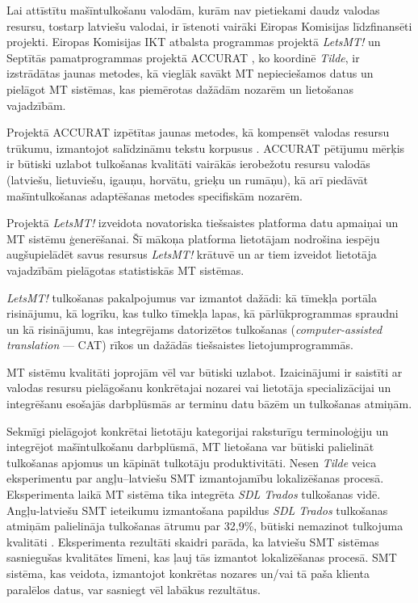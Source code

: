 \begin{multicols}{2}
Lai attīstītu mašīntulkošanu valodām, kurām nav pietiekami daudz valodas resursu, tostarp latviešu valodai, ir īstenoti vairāki Eiropas Komisijas līdzfinansēti projekti. 
Eiropas Komisijas IKT atbalsta programmas projektā \textit{LetsMT!} \cite{Meta30} un Septītās pamatprogrammas projektā ACCURAT \cite{Meta31}, ko koordinē \textit{Tilde}, ir izstrādātas jaunas metodes, kā vieglāk savākt MT nepieciešamos datus un pielāgot MT sistēmas, kas piemērotas dažādām nozarēm un lietošanas vajadzībām.

Projektā ACCURAT izpētītas jaunas metodes, kā kompensēt valodas resursu trūkumu, izmantojot salīdzināmu tekstu korpusus \cite{Meta32, Meta33}. 
ACCURAT pētījumu mērķis ir būtiski uzlabot tulkošanas kvalitāti vairākās ierobežotu resursu valodās (latviešu, lietuviešu, igauņu, horvātu, grieķu un rumāņu), kā arī piedāvāt mašīntulkošanas adaptēšanas metodes specifiskām nozarēm.

Projektā \textit{LetsMT!} \cite{Meta34} izveidota novatoriska tiešsaistes platforma datu apmaiņai un MT sistēmu ģenerēšanai.
Šī mākoņa platforma lietotājam nodrošina iespēju augšupielādēt savus resursus \textit{LetsMT!} krātuvē un ar tiem izveidot lietotāja vajadzībām pielāgotas statistiskās MT sistēmas. 

\textit{LetsMT!} tulkošanas pakalpojumus var izmantot dažādi: kā tīmekļa portāla risinājumu, kā logrīku, kas tulko tīmekļa lapas, kā pārlūkprogrammas spraudni un kā risinājumu, kas integrējams datorizētos tulkošanas (\textit{computer-assisted translation} — CAT) rīkos un dažādās tiešsaistes lietojumprogrammās. 

MT sistēmu kvalitāti joprojām vēl var būtiski uzlabot.
Izaicinājumi ir saistīti ar valodas resursu pielāgošanu konkrētajai nozarei vai lietotāja specializācijai un integrēšanu esošajās darbplūsmās ar terminu datu bāzēm un tulkošanas atmiņām. 

Sekmīgi pielāgojot konkrētai lietotāju kategorijai raksturīgu terminoloģiju un integrējot mašīntulkošanu darbplūsmā, MT lietošana var būtiski palielināt tulkošanas apjomus un kāpināt tulkotāju produktivitāti.
Nesen \textit{Tilde} veica eksperimentu par angļu--latviešu SMT izmantojamību lokalizēšanas procesā.
Eksperimenta laikā MT sistēma tika integrēta \textit{SDL Trados} tulkošanas vidē.
Angļu-latviešu SMT ieteikumu izmantošana papildus \textit{SDL Trados} tulkošanas atmiņām palielināja tulkošanas ātrumu par 32,9\%, būtiski nemazinot tulkojuma kvalitāti \cite{Meta35}.
Eksperimenta rezultāti skaidri parāda, ka latviešu SMT sistēmas sasniegušas kvalitātes līmeni, kas ļauj tās izmantot lokalizēšanas procesā. 
SMT sistēma, kas veidota, izmantojot konkrētas nozares un/vai tā paša klienta paralēlos datus, var sasniegt vēl labākus rezultātus.


\end{multicols}
